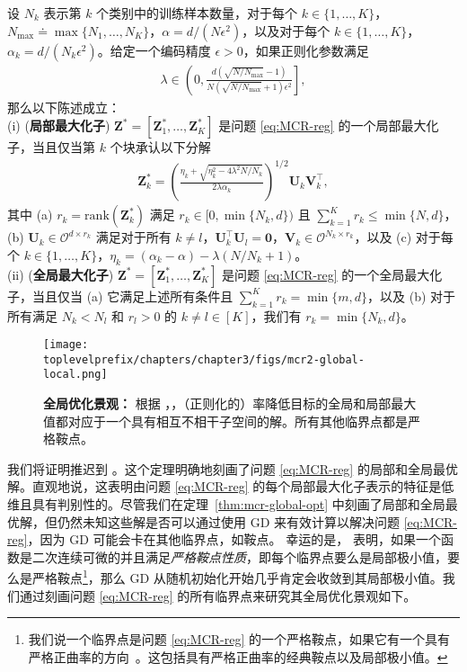 \documentclass[../../book-main.tex]{subfiles}
\begin{document}
\begin{theorem}[\bf 局部和全局最优解]\label{thm:mcr-global-opt}
	设 $N_k$ 表示第 $k$ 个类别中的训练样本数量，对于每个 $k \in \{1,\dots,K\}$，$N_{\max} \doteq \max\{N_1,\dots,N_K\}$，$\alpha=d/(N\epsilon^2)$，以及对于每个 $k \in \{1,\dots,K\}$，$\alpha_{k} = d/(N_k\epsilon^2)$。给定一个编码精度 $\epsilon > 0$，如果正则化参数满足
	\begin{align}\label{eq:lambda}
		\lambda \in \left(0, \frac{d(\sqrt{N/N_{\max}}-1)}{N(\sqrt{N/N_{\max}}+1)\epsilon^2} \right],
	\end{align}
	那么以下陈述成立：\\
	(i) ({\bf 局部最大化子}) $\bm Z^* = \left[\bm Z_1^*,\dots,\bm Z_K^* \right]$ 是问题 \eqref{eq:MCR-reg} 的一个局部最大化子，当且仅当第 $k$ 个块承认以下分解
	\begin{align}\label{eq:Zk opti}
		\bm Z_k^* = \left(\frac{ \eta_k + \sqrt{\eta_k^2 - 4\lambda^2N/N_k}}{2\lambda \alpha_{k}}\right)^{1/2} \bm U_k \bm V_k^\top,
	\end{align}
	其中 (a) $r_k = \mathrm{rank}(\bm Z_k^*)$ 满足 $r_k \in [0,\min\{N_k,d\})$ 且 $\sum_{k=1}^K r_k \le \min\{N,d\}$，(b) $\bm U_k \in \mathcal{O}^{d \times r_k}$ 满足对于所有 $k \neq l$，$\bm U_k^{\top}\bm U_l = \bm 0$，$\bm V_k \in \mathcal{O}^{N_k \times r_k}$，以及 (c) 对于每个 $k\in \{1,\dots,K\}$，$\eta_k=(\alpha_k-\alpha) - \lambda(N/N_k+1)$。
	\\
	(ii) ({\bf 全局最大化子}) $\bm Z^* = \left[\bm Z_1^*,\dots,\bm Z_K^* \right]$ 是问题 \eqref{eq:MCR-reg} 的一个全局最大化子，当且仅当 (a) 它满足上述所有条件且 $\sum_{k=1}^K r_k = \min\{m,d\}$，以及 (b) 对于所有满足 $N_k < N_l$ 和 $r_l > 0$ 的 $k \neq l \in [K]$，我们有 $r_k = \min\{N_k,d\}$。
\end{theorem}

\begin{figure}[t]
	\centering
	\texttt{[image: \\toplevelprefix/chapters/chapter3/figs/mcr2-global-local.png]}
	\caption{{\bf 全局优化景观：} 根据 \cite{sun2015nonconvex,lee2016gradient}，，（正则化的）率降低目标的全局和局部最大值都对应于一个具有相互不相干子空间的解。所有其他临界点都是严格鞍点。}
	\label{fig:mcr-global-local}
\end{figure}

我们将证明推迟到 \cite{wang2024global}。这个定理明确地刻画了问题 \eqref{eq:MCR-reg} 的局部和全局最优解。直观地说，这表明由问题 \eqref{eq:MCR-reg} 的每个局部最大化子表示的特征是低维且具有判别性的。尽管我们在定理~\ref{thm:mcr-global-opt} 中刻画了局部和全局最优解，但仍然未知这些解是否可以通过使用 GD 来有效计算以解决问题 \eqref{eq:MCR-reg}，因为 GD 可能会卡在其他临界点，如鞍点。
幸运的是，\cite{sun2015nonconvex,lee2016gradient} 表明，如果一个函数是二次连续可微的并且满足{\em 严格鞍点性质}，即每个临界点要么是局部极小值，要么是严格鞍点\footnote{我们说一个临界点是问题 \eqref{eq:MCR-reg} 的一个严格鞍点，如果它有一个具有严格正曲率的方向~\cite{sun2015nonconvex}。这包括具有严格正曲率的经典鞍点以及局部极小值。}，那么 GD 从随机初始化开始几乎肯定会收敛到其局部极小值。我们通过刻画问题 \eqref{eq:MCR-reg} 的所有临界点来研究其全局优化景观如下。
\end{document}
